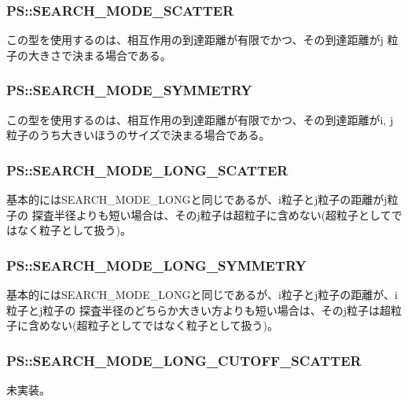 \subsubsection{PS::SEARCH\_MODE\_SCATTER}

この型を使用するのは、相互作用の到達距離が有限でかつ、その到達距離がj
粒子の大きさで決まる場合である。

\subsubsection{PS::SEARCH\_MODE\_SYMMETRY}

この型を使用するのは、相互作用の到達距離が有限でかつ、その到達距離がi,
j粒子のうち大きいほうのサイズで決まる場合である。

\subsubsection{PS::SEARCH\_MODE\_LONG\_SCATTER}

基本的にはSEARCH\_MODE\_LONGと同じであるが、i粒子とj粒子の距離がj粒子の
探査半径よりも短い場合は、そのj粒子は超粒子に含めない(超粒子としてではなく粒子として扱う)。

\subsubsection{PS::SEARCH\_MODE\_LONG\_SYMMETRY}

基本的にはSEARCH\_MODE\_LONGと同じであるが、i粒子とj粒子の距離が、i粒子とj粒子の
探査半径のどちらか大きい方よりも短い場合は、そのj粒子は超粒子に含めない(超粒子としてではなく粒子として扱う)。


\subsubsection{PS::SEARCH\_MODE\_LONG\_CUTOFF\_SCATTER}

未実装。
